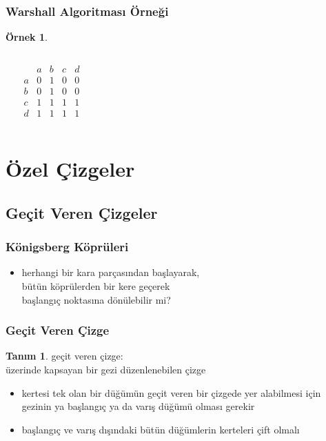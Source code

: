\documentclass[dvipsnames]{beamer}
\theoremstyle{definition}
\newtheorem{tanim}[theorem]{Tanım}
\theoremstyle{example}
\newtheorem{ornek}[theorem]{Örnek}
\theoremstyle{plain}
\begin{document}
\begin{frame}
  \frametitle{Warshall Algoritması Örneği}

  \begin{ornek}
    \begin{columns}
      \begin{center}
      \end{center}

      \[
        \begin{array}{c|cccc}
              & a & b & c & d\\\hline
            a & 0 & 1 & 0 & 0\\
            b & 0 & 1 & 0 & 0\\
            c & 1 & 1 & 1 & 1\\
            d & 1 & 1 & 1 & 1
        \end{array}
      \]
    \end{columns}
  \end{ornek}
\end{frame}

\section{Özel Çizgeler}

\subsection{Geçit Veren Çizgeler}

\begin{frame}
  \frametitle{Königsberg Köprüleri}

  \begin{center}
  \end{center}

  \begin{itemize}
    \item herhangi bir kara parçasından başlayarak,\\
      bütün köprülerden bir kere geçerek\\
      başlangıç noktasına dönülebilir mi?
  \end{itemize}
\end{frame}

\begin{frame}
  \frametitle{Geçit Veren Çizge}

  \begin{tanim}
    \alert{geçit veren çizge}:\\
    üzerinde kapsayan bir gezi düzenlenebilen çizge
  \end{tanim}

  \begin{itemize}
    \pause
    \item kertesi tek olan bir düğümün geçit veren bir çizgede yer alabilmesi
      için gezinin ya başlangıç ya da varış düğümü olması gerekir

    \pause
    \item başlangıç ve varış dışındaki bütün düğümlerin kerteleri çift olmalı
  \end{itemize}
\end{frame}
\end{document}
